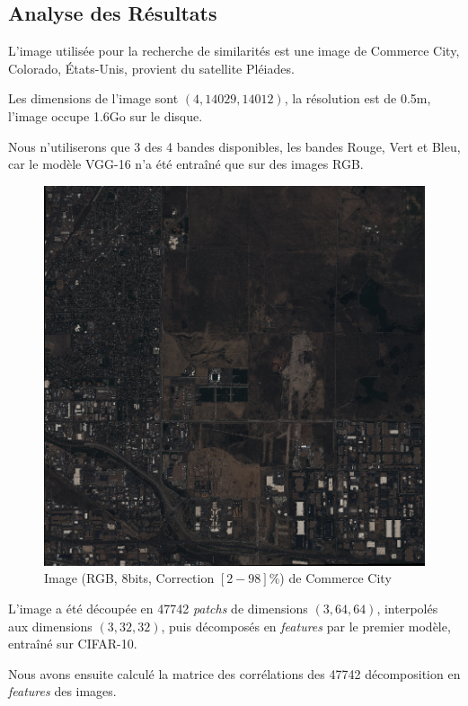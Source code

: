 \documentclass[a4paper, 11pt]{report}
\begin{document}
\subsection{Analyse des Résultats}
L'image utilisée pour la recherche de similarités est une image de Commerce City, Colorado, États-Unis, provient du satellite Pléiades.

Les dimensions de l'image sont $(4, 14029, 14012)$, la résolution est de 0.5m, l'image occupe 1.6Go sur le disque.

Nous n’utiliserons que 3 des 4 bandes disponibles, les bandes Rouge, Vert et Bleu, car le modèle VGG-16 n'a été entraîné que sur des images RGB.

\begin{figure}[H]
	\begin{center}
		\includegraphics[scale=0.9]{Images/CommerceCity.png}
		\caption{Image (RGB, 8bits, Correction $[2-98]\%$) de Commerce City}
	\end{center}
\end{figure}

L'image a été découpée en 47742 \emph{patchs} de dimensions $(3, 64, 64)$, interpolés aux dimensions $(3, 32, 32)$, puis décomposés en \emph{features} par le premier modèle, entraîné sur CIFAR-10.

Nous avons ensuite calculé la matrice des corrélations des 47742 décomposition en \emph{features} des images.
\end{document}

